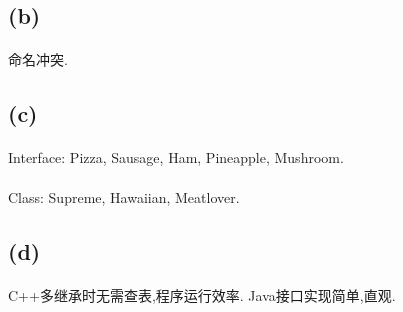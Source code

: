 \documentclass[A4paper,10pt]{paper}
\begin{document}
	\subsection*{(b)}
	\paragraph{} 命名冲突.
	
	\subsection*{(c)}
	\paragraph{} Interface: Pizza, Sausage, Ham, Pineapple, Mushroom.
	\paragraph{} Class: Supreme, Hawaiian, Meatlover.
	
	\subsection*{(d)}
	\paragraph{} C++多继承时无需查表,程序运行效率. Java接口实现简单,直观.
	
\end{document}
